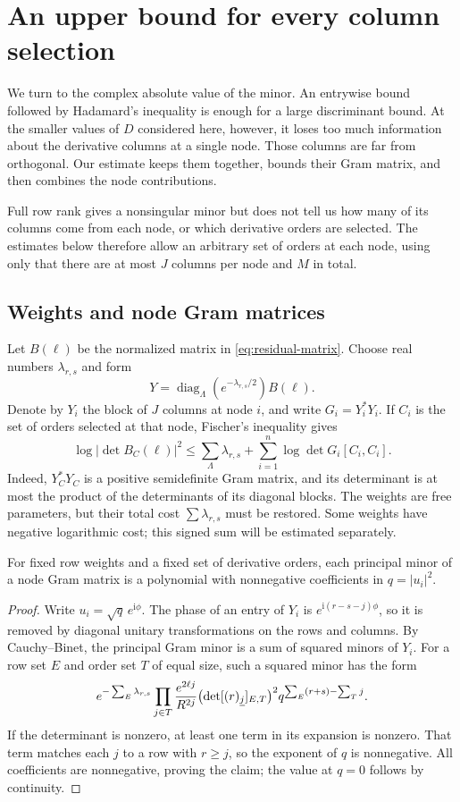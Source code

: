 \section{An upper bound for every column selection}\label{sec:metric}
We turn to the complex absolute value of the minor. An entrywise bound followed by Hadamard's inequality is enough for a large discriminant bound. At the smaller values of $D$ considered here, however, it loses too much information about the derivative columns at a single node. Those columns are far from orthogonal. Our estimate keeps them together, bounds their Gram matrix, and then combines the node contributions.

Full row rank gives a nonsingular minor but does not tell us how many of
its columns come from each node, or which derivative orders are selected.
The estimates below therefore allow an arbitrary set of orders at each
node, using only that there are at most $J$ columns per node and $M$ in
total.

\subsection{Weights and node Gram matrices}
Let $B(\ell)$ be the normalized matrix in \eqref{eq:residual-matrix}. Choose real numbers $\lambda_{r,s}$ and form
\[
 Y=\operatorname{diag}_{\Lambda}(e^{-\lambda_{r,s}/2})B(\ell).
\]
Denote by $Y_i$ the block of $J$ columns at node $i$, and write $G_i=Y_i^*Y_i$. If $C_i$ is the set of orders selected at that node, Fischer's inequality gives
\begin{equation}\label{eq:fischer}
 \log|\det B_C(\ell)|^2
 \leq\sum_\Lambda\lambda_{r,s}
       +\sum_{i=1}^n\log\det G_i[C_i,C_i].
\end{equation}
Indeed, $Y_C^*Y_C$ is a positive semidefinite Gram matrix, and its determinant is at most the product of the determinants of its diagonal blocks. The weights are free parameters, but their total cost $\sum\lambda_{r,s}$ must be restored. Some weights have negative logarithmic cost; this signed sum will be estimated separately.

\begin{lemma}\label{lem:radial}
For fixed row weights and a fixed set of derivative orders, each principal minor of a node Gram matrix is a polynomial with nonnegative coefficients in $q=|u_i|^2$.
\end{lemma}
\begin{proof}
Write $u_i=\sqrt q\,e^{\mathrm i\phi}$. The phase of an entry of $Y_i$ is $e^{\mathrm i(r-s-j)\phi}$, so it is removed by diagonal unitary transformations on the rows and columns. By Cauchy--Binet, the principal Gram minor is a sum of squared minors of $Y_i$. For a row set $E$ and order set $T$ of equal size, such a squared minor has the form
\[
 e^{-\sum_E\lambda_{r,s}}
 \prod_{j\in T}\frac{e^{2\ell j}}{R^{2j}}
 \bigl(\det[(r)_{\underline{j}}]_{E,T}\bigr)^2
 q^{\sum_E(r+s)-\sum_Tj}.
\]
If the determinant is nonzero, at least one term in its expansion is nonzero. That term matches each $j$ to a row with $r\geq j$, so the exponent of $q$ is nonnegative. All coefficients are nonnegative, proving the claim; the value at $q=0$ follows by continuity.
\end{proof}

